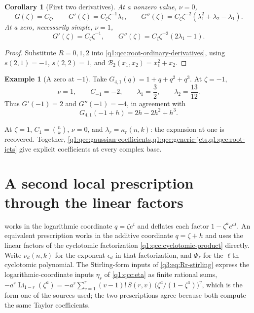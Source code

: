 \documentclass[11pt,a4paper,oneside,openany]{book}
\newtheorem{corollary}[theorem]{Corollary}
\theoremstyle{definition}
\newtheorem{example}[theorem]{Example}
\theoremstyle{remark}
\newcommand{\Y}[1]{\mathcal B_{#1}}
\DeclareMathOperator{\Li}{Li}
\begin{document}
\begin{corollary}[First two derivatives]\label{q1:qcc:root-low-jets}
At a nonzero value, \(\nu=0\),
\[
 G(\zeta)=C_\zeta,\qquad
 G'(\zeta)=C_\zeta\zeta^{-1}\lambda_1,\qquad
 G''(\zeta)=C_\zeta\zeta^{-2}
             (\lambda_1^2+\lambda_2-\lambda_1).
\]
At a zero, necessarily simple, \(\nu=1\),
\[
 G'(\zeta)=C_\zeta\zeta^{-1},\qquad
 G''(\zeta)=C_\zeta\zeta^{-2}(2\lambda_1-1).
\]
\end{corollary}
\begin{proof}
Substitute \(R=0,1,2\) into
\eqref{q1:qcc:root-ordinary-derivatives}, using
\(s(2,1)=-1\), \(s(2,2)=1\), and
\(\Y2(x_1,x_2)=x_1^2+x_2\).
\end{proof}

\begin{example}[A zero at \(-1\)]
Take \(G_{4,1}(q)=1+q+q^2+q^3\). At \(\zeta=-1\),
\[
 \nu=1,\qquad C_{-1}=-2,\qquad
 \lambda_1=\frac32,\qquad\lambda_2=\frac{13}{12}.
\]
Thus \(G'(-1)=2\) and \(G''(-1)=-4\), in agreement with
\[
 G_{4,1}(-1+h)=2h-2h^2+h^3.
\]
\end{example}

At \(\zeta=1\), \(C_1=\binom nk\), \(\nu=0\), and
\(\lambda_r=\kappa_r(n,k)\): the expansion at one is recovered. Together,
\cref{q1:qcc:gaussian-coefficients,q1:qcc:generic-jets,q1:qcc:root-jets} give explicit
coefficients at every complex base.

\section{A second local prescription through the linear factors}
 works in the logarithmic coordinate \(q=\zeta e^t\)
and deflates each factor \(1-\zeta^ae^{at}\). An equivalent prescription works
in the additive coordinate \(q=\zeta+h\) and uses the linear factors of the
cyclotomic factorization \eqref{q1:qcc:cyclotomic-product} directly. Write
\(\nu_d(n,k)\) for the exponent \(\epsilon_d\) in that factorization, and
\(\Phi_\ell\) for the \(\ell\)th cyclotomic polynomial. The Stirling-form
inputs of \eqref{q3:eq:Rr-stirling} express the logarithmic-coordinate
inputs \(\eta_r\) of \eqref{q1:qcc:eta} as finite rational sums,
\(-a^r\Li_{1-r}(\zeta^a)=-a^r\sum_{v=1}^{r}(v-1)!\,S(r,v)\,
\bigl(\zeta^a/(1-\zeta^a)\bigr)^v\), which is the form one of the sources
used; the two prescriptions agree because both compute the same Taylor
coefficients.
\end{document}
